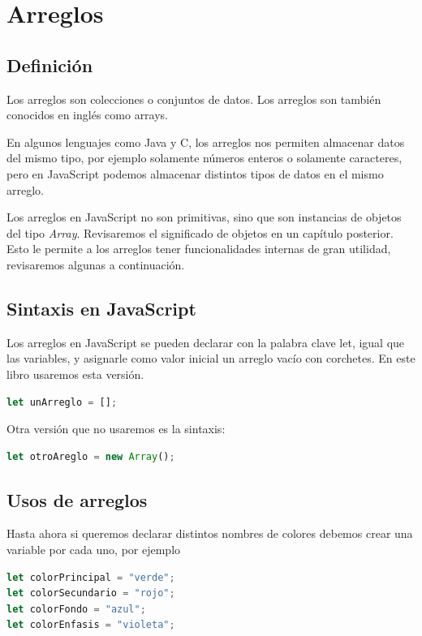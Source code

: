 \documentclass[../principal.tex]{subfiles}
\begin{document}
\chapter{Arreglos}

\section{Definición}

Los arreglos son colecciones o conjuntos de datos. Los arreglos son también conocidos en inglés como arrays.

En algunos lenguajes como Java y C, los arreglos nos permiten almacenar datos del mismo tipo, por ejemplo solamente números enteros o solamente caracteres, pero en JavaScript podemos almacenar distintos tipos de datos en el mismo arreglo.

Los arreglos en JavaScript no son primitivas, sino que son instancias de objetos del tipo \textit{Array}. Revisaremos el significado de objetos en un capítulo posterior. Esto le permite a los arreglos tener funcionalidades internas de gran utilidad, revisaremos algunas a continuación.

\section{Sintaxis en JavaScript}

Los arreglos en JavaScript se pueden declarar con la palabra clave let, igual que las variables, y asignarle como valor inicial un arreglo vacío con corchetes. En este libro usaremos esta versión.

\begin{lstlisting}[language=JavaScript]
let unArreglo = [];
\end{lstlisting}

Otra versión que no usaremos es la sintaxis:

\begin{lstlisting}[language=JavaScript]
let otroAreglo = new Array();
\end{lstlisting}

\section{Usos de arreglos}

Hasta ahora si queremos declarar distintos nombres de colores debemos crear una variable por cada uno, por ejemplo

\begin{lstlisting}[language=JavaScript]
let colorPrincipal = "verde";
let colorSecundario = "rojo";
let colorFondo = "azul";
let colorEnfasis = "violeta";
\end{lstlisting}
\end{document}
